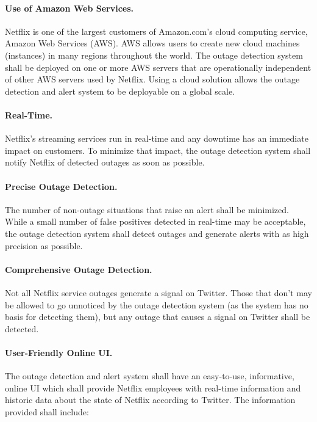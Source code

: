\documentclass[12pt]{ucthesis}
\begin{document}
\paragraph{Use of Amazon Web Services.}
Netflix is one of the largest customers of Amazon.com's cloud computing
service, Amazon Web Services (AWS). AWS allows users to create new cloud
machines (instances) in many regions throughout the world. The outage
detection system shall be deployed on one or more AWS servers that are
operationally independent of other AWS servers used by Netflix. Using a cloud
solution allows the outage detection and alert system to be deployable on a
global scale.

\paragraph{Real-Time.}
Netflix's streaming services run in real-time and any downtime has an immediate
impact on customers. To minimize that impact, the outage detection system shall notify
Netflix of detected outages as soon as possible.

\paragraph{Precise Outage Detection.}
The number of non-outage situations that raise an alert shall be minimized.
While a small number of false positives detected in real-time may be acceptable,
the outage detection system shall detect outages and generate alerts with as
high precision as possible.

\paragraph{Comprehensive Outage Detection.}
Not all Netflix service outages generate a signal on Twitter. Those that don't may
be allowed to go unnoticed by the outage detection system (as the system
has no basis for detecting them), but any outage that causes a signal on
Twitter shall be detected.

\paragraph{User-Friendly Online UI.}
The outage detection and alert system shall have an easy-to-use, informative,
online UI which shall provide Netflix employees with real-time information and
historic data about the state of Netflix according to Twitter. The information
provided shall include:
\end{document}
